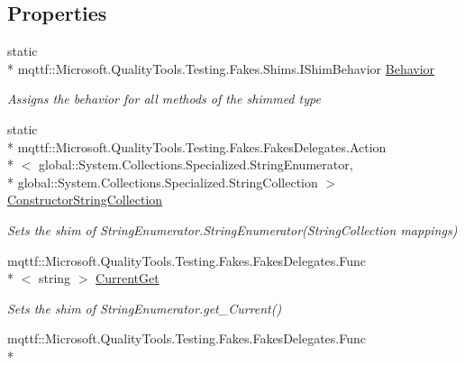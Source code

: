 \subsection*{Properties}
\begin{DoxyCompactItemize}
\item 
static \\*
mqttf\-::\-Microsoft.\-Quality\-Tools.\-Testing.\-Fakes.\-Shims.\-I\-Shim\-Behavior \hyperlink{class_system_1_1_collections_1_1_specialized_1_1_fakes_1_1_shim_string_enumerator_ab544988f53d4c10008bfeb93c19d2952}{Behavior}
\begin{DoxyCompactList}\small\item\em Assigns the behavior for all methods of the shimmed type\end{DoxyCompactList}\item 
static \\*
mqttf\-::\-Microsoft.\-Quality\-Tools.\-Testing.\-Fakes.\-Fakes\-Delegates.\-Action\\*
$<$ global\-::\-System.\-Collections.\-Specialized.\-String\-Enumerator, \\*
global\-::\-System.\-Collections.\-Specialized.\-String\-Collection $>$ \hyperlink{class_system_1_1_collections_1_1_specialized_1_1_fakes_1_1_shim_string_enumerator_a35fd62dfd891b2535e606aa79f12cf95}{Constructor\-String\-Collection}
\begin{DoxyCompactList}\small\item\em Sets the shim of String\-Enumerator.\-String\-Enumerator(\-String\-Collection mappings)\end{DoxyCompactList}\item 
mqttf\-::\-Microsoft.\-Quality\-Tools.\-Testing.\-Fakes.\-Fakes\-Delegates.\-Func\\*
$<$ string $>$ \hyperlink{class_system_1_1_collections_1_1_specialized_1_1_fakes_1_1_shim_string_enumerator_ac127b2dd8625a0c8515d796c6679c39a}{Current\-Get}
\begin{DoxyCompactList}\small\item\em Sets the shim of String\-Enumerator.\-get\-\_\-\-Current()\end{DoxyCompactList}\item 
mqttf\-::\-Microsoft.\-Quality\-Tools.\-Testing.\-Fakes.\-Fakes\-Delegates.\-Func\\*

\end{DoxyCompactItemize}
